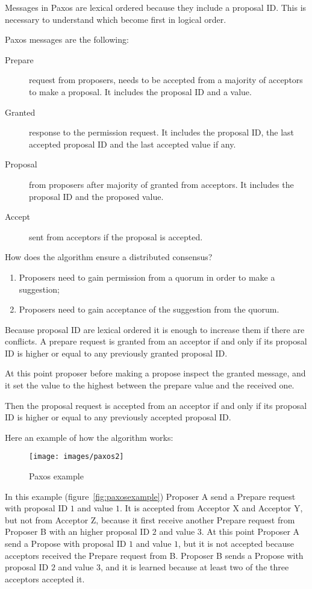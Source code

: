 Messages in Paxos are lexical ordered because they include a proposal ID. This is necessary to understand which become first in logical order.

Paxos messages are the following:
\begin{description}
    \item[Prepare] request from proposers, needs to be accepted from a majority of acceptors to make a proposal. It includes the proposal ID and a value.
    \item[Granted] response to the permission request. It includes the proposal ID, the last accepted proposal ID and the last accepted value if any.
    \item[Proposal] from proposers after majority of granted from acceptors. It includes the proposal ID and the proposed value.
    \item[Accept] sent from acceptors if the proposal is accepted.
\end{description}

How does the algorithm ensure a distributed consensus?
\begin{enumerate}
    \item Proposers need to gain permission from a quorum in order to make a suggestion;
    \item Proposers need to gain acceptance of the suggestion from the quorum.
\end{enumerate}

Because proposal ID are lexical ordered it is enough to increase them if there are conflicts.
A prepare request is granted from an acceptor if and only if its proposal ID is higher or equal to any previously granted proposal ID.

At this point proposer before making a propose inspect the granted message, and it set the value to the highest between the prepare value and the received one.

Then the proposal request is accepted from an acceptor if and only if its proposal ID is higher or equal to any previously accepted proposal ID.

Here an example of how the algorithm works:

\begin{figure}[H]
    \centering
    \texttt{[image: images/paxos2]}
    \caption{Paxos example}
    \label{fig:paxosexample}
\end{figure}

In this example (figure~\vref{fig:paxosexample}) Proposer A send a Prepare request with proposal ID $1$ and value $1$. It is accepted from Acceptor X and Acceptor Y, but not from Acceptor Z, because it first receive another Prepare request from Proposer B with an higher proposal ID $2$ and value $3$.
At this point Proposer A send a Propose with proposal ID $1$ and value $1$, but it is not accepted because acceptors received the Prepare request from B.
Proposer B sends a Propose with proposal ID $2$ and value $3$, and it is learned because at least two of the three acceptors accepted it.

